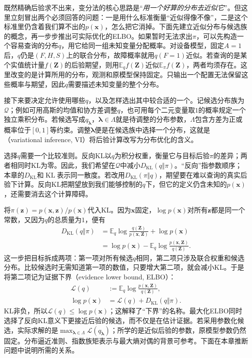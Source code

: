 既然精确后验求不出来，变分法的核心思路是“\emph{用一个好算的分布去近似它}”。但这里立刻冒出两个必须回答的问题：一是用什么标准衡量“近似得像不像”，二是这个标准里仍含着我们算不出的$p(\bm x)$，怎么把它消掉。下面先建立近似分布与候选族的概念，再一步步推出可实际优化的ELBO。如果暂时无法求出$\pi$，可以先构造一个容易查询的分布$q$，用它给同一组未知变量分配概率。对设备模型，固定$A=1$后，$q$仍是$(F,H,S)$上的联合分布，故障概率就用$q(F=1)$近似。若查询的是某个实值统计量$f(\bm Z)$的后验期望，则用$\mathbb E_q f(\bm Z)$近似$\mathbb E_\pi f(\bm Z)$，两者均须存在。这里改变的是计算所用的分布，观测和原模型保持固定。只输出一个配置无法保留这些概率与期望，因此$q$需要描述未知变量的整个分布。

接下来要决定允许使用哪些$q$，以及怎样选出其中较合适的一个。记候选分布族为$\mathcal Q$；例如可用高斯的均值和协方差调整$q$，也可用每个二元变量取$1$的概率规定一个独立乘积分布。若候选写成$q_{\bm\lambda}$，$\bm\lambda\in\Lambda$就是待调整的分布参数，$\Lambda$包含方差为正或概率位于$[0,1]$等约束。调整$\bm\lambda$便是在候选族中选择一个分布，这就是（variational inference, VI）将后验计算改写为分布优化的含义。

选择$q$需要一个比较准则。反向KL以$q$为积分权重，衡量它与目标后验$\pi$的差异；两者相同时KL为零。因此，我们希望在$\mathcal Q$中减小$D_{\mathrm{KL}}(q\Vert\pi)$。“反向”指参数顺序；本章的$D_{\mathrm{KL}}$和$\operatorname{KL}$表示同一散度。若改用$D_{\mathrm{KL}}(\pi\Vert q)$，期望要在难以查询的真实后验下计算。反向KL把期望放到我们能够控制的$q$下，但它的定义仍含未知的$p(\bm x)$，还需要消去这个计算障碍。

将$\pi(\bm z)=p(\bm x,\bm z)/p(\bm x)$代入KL。因为$\bm x$固定，$\log p(\bm x)$对所有$\bm z$都是同一个常数，又因为$q$的总质量为$1$，便有
\[
  \begin{aligned}
    D_{\mathrm{KL}}(q\Vert\pi)
      &=\mathbb E_q\log\frac{q(\bm Z)}{p(\bm x,\bm Z)}
          +\log p(\bm x)\\
      &=\log p(\bm x)
          -\mathbb E_q\log\frac{p(\bm x,\bm Z)}{q(\bm Z)}.
  \end{aligned}
\]
这一步把目标拆成两项：第一项对所有候选$q$相同，第二项只涉及联合权重和候选分布。比较候选时无需知道第一项的数值，只要增大第二项，就会减小KL。于是将第二项记为证据下界（evidence lower bound, ELBO）：
\begin{equation}
  \begin{aligned}
    \mathcal L(q)
      &:=\mathbb E_q\log\frac{p(\bm x,\bm Z)}{q(\bm Z)},\\
    \log p(\bm{x})
      &=\mathcal L(q)+D_{\mathrm{KL}}(q\Vert\pi).
  \end{aligned}
  \label{eq:pgm-variational-elbo}
\end{equation}
KL非负，所以$\mathcal L(q)\leq\log p(\bm x)$；这解释了“下界”的名称。最大化ELBO同时选择了反向KL意义下更接近后验的候选，而不仅是在估计证据。若采用参数化候选，实际求解的是$\max_{\bm\lambda\in\Lambda}\mathcal L(q_{\bm\lambda})$；所学的是近似后验的参数，原模型参数仍然固定。分布逼近准则、指数族矩表示与最大熵对偶的背景可参考。下面在本章推断问题中说明所需的关系。


